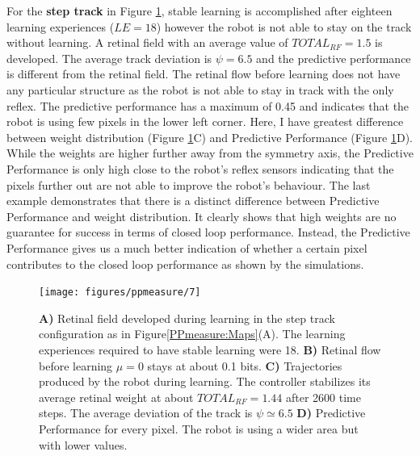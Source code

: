 For the \textbf{step track} in Figure \ref{PPmeasure:step}, stable learning
is accomplished after eighteen learning experiences ($LE=18$) however the robot
is not able to stay on the track without learning.
A retinal field with an average value of $TOTAL_{RF}=1.5$ is developed.
The average track deviation is $\psi=6.5$ and the predictive performance is different
from the retinal field. The retinal flow before learning does not have any particular structure as the robot is not able to stay in track
with the only reflex. The predictive performance has a maximum of 0.45 and indicates that the robot is using few pixels in the lower 
left corner.
Here, I have greatest difference between weight
distribution (Figure \ref{PPmeasure:step}C) and Predictive Performance (Figure \ref{PPmeasure:step}D).
While the weights are higher further away from the symmetry axis, the Predictive Performance is
only high close to the robot’s reﬂex sensors indicating that the pixels further out
are not able to improve the robot’s behaviour.
The last example demonstrates that there is a distinct difference between Predictive
Performance and weight distribution. It clearly shows that high weights
are no guarantee for success in terms of closed loop performance. Instead, the
Predictive Performance gives us a much better indication of whether a certain
pixel contributes to the closed loop performance as shown by the simulations.

\begin{figure}[!hbt]
	\begin{center}
		\texttt{[image: figures/ppmeasure/7]}
	\end{center}
	\caption[Performance for the step track]{
	{\bf A)} Retinal field developed during learning in the step track configuration as in Figure\ref{PPmeasure:Maps}(A).
		      The learning experiences required to have stable learning were 18.
	{\bf B)} Retinal flow before learning $\mu=0$ stays at about 0.1 bits. 
	{\bf C)} Trajectories produced by the robot during learning. The controller stabilizes its average retinal weight at about $TOTAL_{RF}=1.44$ after 2600 time steps. The average deviation of the track is $\psi \simeq 6.5$  
	{\bf D)} Predictive Performance for every pixel. The robot is using a wider area but with lower values. \label{PPmeasure:step}}
\end{figure}

